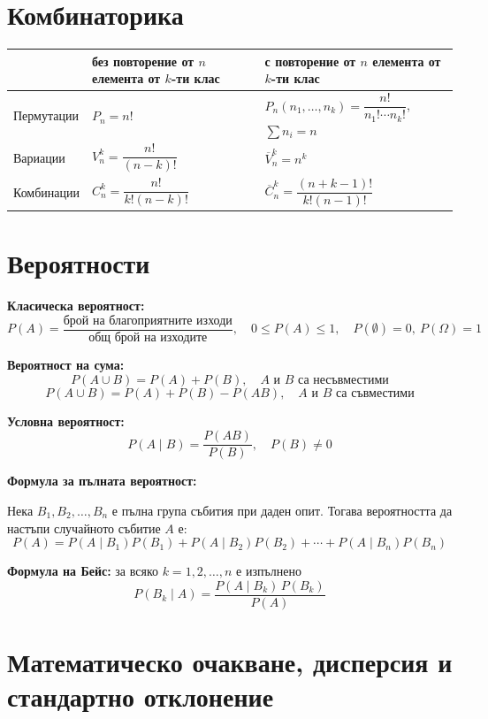 \documentclass[12pt,a4paper]{article}
\begin{document}
\section{Комбинаторика}

\begin{center}
\small
\renewcommand{\arraystretch}{2.2}
\begin{tabularx}{\textwidth}{X>{\centering\arraybackslash}X>{\centering\arraybackslash}X}
\toprule
 & \textbf{без повторение от $n$ елемента от $k$-ти клас} & \textbf{с повторение от $n$ елемента от $k$-ти клас} \\
\midrule
Пермутации & $P_n=n!$ & $P_n(n_1,\ldots,n_k)=\dfrac{n!}{n_1!\cdots n_k!}$, \newline $\sum n_i=n$ \\
Вариации & $V_n^k=\dfrac{n!}{(n-k)!}$ & $\overline{V}_n^k=n^k$ \\
Комбинации & $C_n^k=\dfrac{n!}{k!(n-k)!}$ & $\overline{C}_n^k=\dfrac{(n+k-1)!}{k!(n-1)!}$ \\
\bottomrule
\end{tabularx}
\end{center}

\section{Вероятности}

\textbf{Класическа вероятност:}
$$P(A)=\frac{\text{брой на благоприятните изходи}}{\text{общ брой на изходите}},\quad 0\le P(A)\le1,\quad P(\emptyset)=0,\ P(\Omega)=1$$

\textbf{Вероятност на сума:}
$$P(A\cup B)=P(A)+P(B),\quad A\text{ и }B\text{ са несъвместими}$$
$$P(A\cup B)=P(A)+P(B)-P(AB),\quad A\text{ и }B\text{ са съвместими}$$

\textbf{Условна вероятност:}
$$P(A\mid B)=\frac{P(AB)}{P(B)},\quad P(B)\neq0$$

\textbf{Формула за пълната вероятност:}

Нека $B_1,B_2,\ldots,B_n$ е пълна група събития при даден опит. Тогава вероятността да настъпи случайното събитие $A$ е:
$$P(A)=P(A\mid B_1)P(B_1)+P(A\mid B_2)P(B_2)+\cdots+P(A\mid B_n)P(B_n)$$

\textbf{Формула на Бейс:} за всяко $k=1,2,\ldots,n$ е изпълнено
$$P(B_k\mid A)=\frac{P(A\mid B_k)\,P(B_k)}{P(A)}$$

\section{Математическо очакване, дисперсия и стандартно отклонение}
\end{document}
